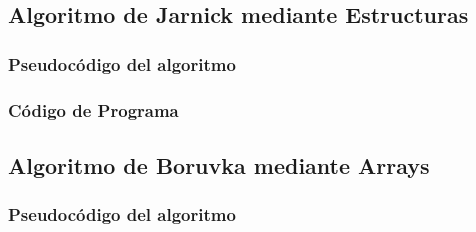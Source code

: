 \documentclass[a4paper]{article}
\begin{document}
\subsection{Algoritmo de Jarnick mediante Estructuras}
\subsubsection{Pseudoc\'odigo del algoritmo}
\subsubsection{C\'odigo de Programa}
\subsection{Algoritmo de Boruvka mediante Arrays}
\subsubsection{Pseudoc\'odigo del algoritmo}
\end{document}
